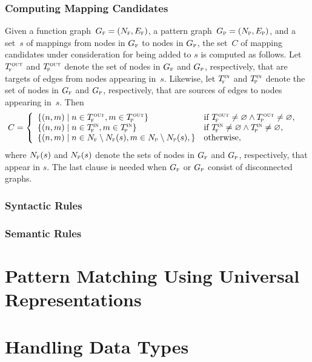 \subsubsection{Computing Mapping Candidates}

Given a \gls{function graph}~\mbox{$\fG = \mPair{\fN}{\fE}$}, a \gls{pattern
  graph}~\mbox{$\pG = \mPair{\pN}{\pE}$}, and a set~$s$ of mappings from
\glspl{node} in $G_{\textrm{\textsc{f}}}$ to \glspl{node} in $G_{\textrm{\textsc{p}}}$, the set~$C$ of mapping
candidates under consideration for being added to $s$ is computed as follows.
%
Let $T_{\!\textrm{\textsc{f}}}^{\hspace{.5pt}\textrm{\textsc{out}}}$ and $T_{\!\textrm{\textsc{p}}}^{\hspace{.5pt}\textrm{\textsc{out}}}$ denote the set of \glspl{node} in $G_{\textrm{\textsc{f}}}$ and $G_{\textrm{\textsc{p}}}$,
respectively, that are targets of \glspl{edge} from \glspl{node} appearing
in~$s$.
%
Likewise, let $T_{\!\textrm{\textsc{f}}}^{\textrm{\textsc{in}}}$ and $T_{\!\textrm{\textsc{p}}}^{\textrm{\textsc{in}}}$ denote the set of \glspl{node} in $G_{\textrm{\textsc{f}}}$ and
$G_{\textrm{\textsc{p}}}$, respectively, that are sources of \glspl{edge} to \glspl{node} appearing
in~$s$.
%
Then
%
\begin{equation}
  \hspace*{-.8em}
  C = \left\{
  \begin{array}{ll}
      \mSetBuilder{\mPair{n}{m}}{n \in \fTout, m \in \pTout}
    & \text{if} \ \fTout \neq \emptyset \mAnd \pTout \neq \emptyset, \\
      \mSetBuilder{\mPair{n}{m}}{n \in \fTin, m \in \pTin}
    & \text{if} \ \fTin \neq \emptyset \mAnd \pTin \neq \emptyset, \\
      \mSetBuilder{\mPair{n}{m}}{
                                  n \in \fN \setminus \fN(s),
                                  m \in \pN \setminus \pN(s),
                                }
    & \text{otherwise},
  \end{array}
 \right.
\end{equation}
%
where $N_{\textrm{\textsc{f}}}(s)$ and $N_{\textrm{\textsc{p}}}(s)$ denote the sets of \glspl{node} in $G_{\textrm{\textsc{f}}}$ and $G_{\textrm{\textsc{p}}}$,
respectively, that appear in $s$.
%
The last clause is needed when $G_{\textrm{\textsc{f}}}$ or $G_{\textrm{\textsc{p}}}$ consist of disconnected
\glspl{graph}.



\subsubsection{Syntactic Rules}




\subsubsection{Semantic Rules}




\section{Pattern Matching Using Universal Representations}





\section{Handling Data Types}

